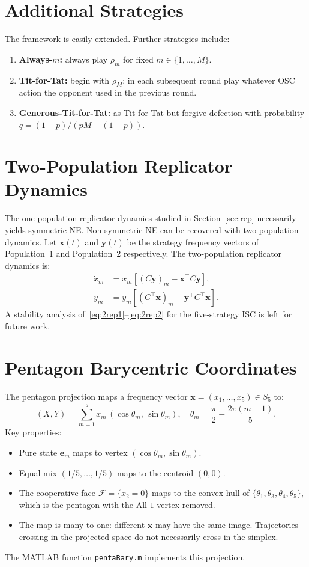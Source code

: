 \documentclass[12pt,a4paper]{article}
\begin{document}
\section{Additional Strategies}

The framework is easily extended.  Further strategies include:

\begin{enumerate}
  \item \textbf{Always-$m$:} always play $\rho_m$ for fixed $m\in\{1,\ldots,M\}$.
  \item \textbf{Tit-for-Tat:} begin with $\rho_M$; in each subsequent round
        play whatever OSC action the opponent used in the previous round.
  \item \textbf{Generous-Tit-for-Tat:} as Tit-for-Tat but forgive defection
        with probability $q=(1-p)/(pM-(1-p))$.
\end{enumerate}

\section{Two-Population Replicator Dynamics}

The one-population replicator dynamics studied in Section~\ref{sec:rep}
necessarily yields symmetric NE.  Non-symmetric NE can be recovered with
two-population dynamics.  Let $\mathbf{x}(t)$ and $\mathbf{y}(t)$ be the
strategy frequency vectors of Population~1 and Population~2 respectively.
The two-population replicator dynamics is:
\begin{align}
  \dot{x}_m &= x_m\left[(C\mathbf{y})_m - \mathbf{x}^\top C\mathbf{y}\right],
  \label{eq:2rep1}\\
  \dot{y}_m &= y_m\left[(C^\top\mathbf{x})_m - \mathbf{y}^\top C^\top\mathbf{x}\right].
  \label{eq:2rep2}
\end{align}
A stability analysis of~\eqref{eq:2rep1}--\eqref{eq:2rep2} for the five-strategy
ISC is left for future work.

\section{Pentagon Barycentric Coordinates}

The pentagon projection maps a frequency vector
$\mathbf{x}=(x_1,\ldots,x_5)\in S_5$ to:
\[
  (X,Y) = \sum_{m=1}^5 x_m\,(\cos\theta_m,\,\sin\theta_m),
  \quad \theta_m = \frac{\pi}{2} - \frac{2\pi(m-1)}{5}.
\]
Key properties:
\begin{itemize}
  \item Pure state $\mathbf{e}_m$ maps to vertex $(\cos\theta_m,\sin\theta_m)$.
  \item Equal mix $(1/5,\ldots,1/5)$ maps to the centroid $(0,0)$.
  \item The cooperative face $\mathcal{F}=\{x_2=0\}$ maps to the convex hull
        of $\{\theta_1,\theta_3,\theta_4,\theta_5\}$, which is the pentagon
        with the All-$1$ vertex removed.
  \item The map is many-to-one: different $\mathbf{x}$ may have the same image.
        Trajectories crossing in the projected space do not necessarily cross
        in the simplex.
\end{itemize}
The MATLAB function \texttt{pentaBary.m} implements this projection.
\end{document}
